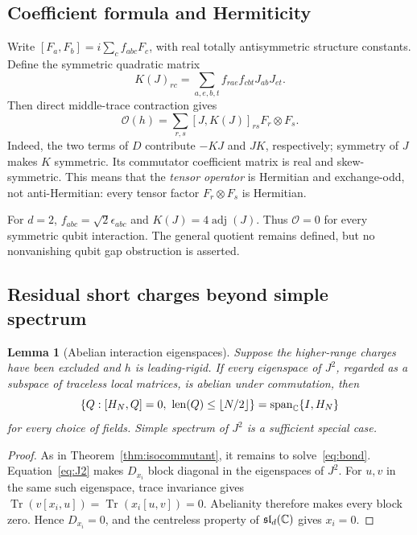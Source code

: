 \documentclass[11pt,a4paper]{article}
\numberwithin{equation}{section}
\newtheorem{lemma}[theorem]{Lemma}
\theoremstyle{definition}\newtheorem{definition}[theorem]{Definition}
\theoremstyle{remark}\newtheorem{remark}[theorem]{Remark}
\DeclareMathOperator{\Tr}{Tr}\DeclareMathOperator{\rank}{rank}
\newcommand{\spanC}{\operatorname{span}_{\mathbb C}}
\newcommand{\g}{\mathfrak{sl}_d(\C)}\newcommand{\id}{\operatorname{id}}
\newcommand{\Ob}{\mathcal O}\newcommand{\tens}{\otimes}
\begin{document}
\subsection{Coefficient formula and Hermiticity}
Write $[F_a,F_b]=i\sum_c f_{abc}F_c$, with real totally antisymmetric structure constants. Define the symmetric quadratic matrix
\begin{equation}\label{eq:K}
 K(J)_{rc}=\sum_{a,e,b,t} f_{rae}f_{cbt}J_{ab}J_{et}.
\end{equation}
Then direct middle-trace contraction gives
\begin{equation}\label{eq:cubiccoeff}
 \Ob(h)=\sum_{r,s}[J,K(J)]_{rs}F_r\tens F_s.
\end{equation}
Indeed, the two terms of $D$ contribute $-KJ$ and $JK$, respectively; symmetry of $J$ makes $K$ symmetric. Its commutator coefficient matrix is real and skew-symmetric. This means that the \emph{tensor operator} is Hermitian and exchange-odd, not anti-Hermitian: every tensor factor $F_r\tens F_s$ is Hermitian.

For $d=2$, $f_{abc}=\sqrt2\epsilon_{abc}$ and $K(J)=4\operatorname{adj}(J)$. Thus $\Ob=0$ for every symmetric qubit interaction. The general quotient remains defined, but no nonvanishing qubit gap obstruction is asserted.

\subsection{Residual short charges beyond simple spectrum}

\begin{lemma}[Abelian interaction eigenspaces]\label{lem:abelian}
Suppose the higher-range charges have been excluded and $h$ is leading-rigid. If every eigenspace of $J^2$, regarded as a subspace of traceless local matrices, is abelian under commutation, then
\begin{equation}\label{eq:IH}
 \{Q:[H_N,Q]=0,\ \len(Q)\le\lfloor N/2\rfloor\}
 =\spanC\{I,H_N\}
\end{equation}
for every choice of fields. Simple spectrum of $J^2$ is a sufficient special case.
\end{lemma}
\begin{proof}
As in Theorem~\ref{thm:isocommutant}, it remains to solve~\eqref{eq:bond}. Equation~\eqref{eq:J2} makes $D_{x_i}$ block diagonal in the eigenspaces of $J^2$. For $u,v$ in the same such eigenspace, trace invariance gives
$\Tr(v[x_i,u])=\Tr(x_i[u,v])=0$. Abelianity therefore makes every block zero. Hence $D_{x_i}=0$, and the centreless property of $\g$ gives $x_i=0$.
\end{proof}
\end{document}
